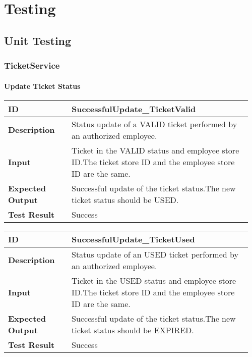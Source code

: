 \chapter{Testing}
\section{Unit Testing}
\subsection{TicketService}
\subsubsection{Update Ticket Status}
\begin{table}[H]
	\centering
	\begin{tabular}{@{}p{0.25\linewidth}p{0.71\linewidth}@{}}
		\toprule
		\textbf{ID} & SuccessfulUpdate\_TicketValid \\
		\midrule
		\textbf{Description} & Status update of a VALID ticket performed by an authorized employee. \\
		\midrule
		\textbf{Input} & Ticket in the VALID status and employee store ID.\newline The ticket store ID and the employee store ID are the same.\\
		\midrule
		\textbf{Expected Output} & Successful update of the ticket status.\newline The new ticket status should be USED. \\
		\midrule
		\textbf{Test Result} & Success\\
		\bottomrule
	\end{tabular}
\end{table}

\begin{table}[H]
	\centering
	\begin{tabular}{@{}p{0.25\linewidth}p{0.71\linewidth}@{}}
		\toprule
		\textbf{ID} & SuccessfulUpdate\_TicketUsed \\
		\midrule
		\textbf{Description} & Status update of an USED ticket performed by an authorized employee. \\
		\midrule
		\textbf{Input} & Ticket in the USED status and employee store ID.\newline The ticket store ID and the employee store ID are the same.\\
		\midrule
		\textbf{Expected Output} & Successful update of the ticket status.\newline The new ticket status should be EXPIRED. \\
		\midrule
		\textbf{Test Result} & Success\\
		\bottomrule
	\end{tabular}
\end{table}

